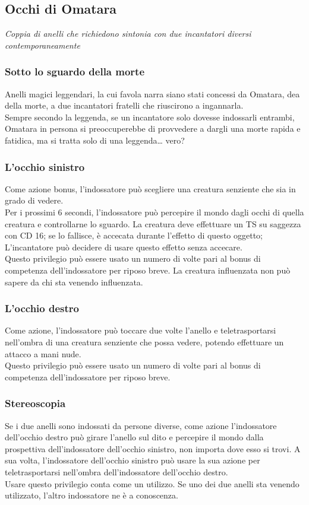 \subsection{Occhi di Omatara}
\textit{Coppia di anelli che richiedono sintonia con due incantatori diversi contemporaneamente}

\subsubsection{Sotto lo sguardo della morte}
Anelli magici leggendari, la cui favola narra siano stati concessi da Omatara, dea della morte, a due incantatori fratelli che riuscirono a ingannarla. \\ Sempre secondo la leggenda, se un incantatore solo dovesse indossarli entrambi, Omatara in persona si preoccuperebbe di provvedere a dargli una morte rapida e fatidica, ma si tratta solo di una leggenda… vero? 

\subsubsection{L'occhio sinistro}
Come azione bonus, l'indossatore può scegliere una creatura senziente che sia in grado di vedere. \\ Per i prossimi 6 secondi, l'indossatore può percepire il mondo dagli occhi di quella creatura e controllarne lo sguardo. La creatura deve effettuare un TS su saggezza con CD 16; se lo fallisce, è accecata durante l'effetto di questo oggetto; L'incantatore può decidere di usare questo effetto senza accecare. \\ Questo privilegio può essere usato un numero di volte pari al bonus di competenza dell'indossatore per riposo breve. La creatura influenzata non può sapere da chi sta venendo influenzata.

\subsubsection{L'occhio destro}
Come azione, l'indossatore può toccare due volte l'anello e teletrasportarsi nell'ombra di una creatura senziente che possa vedere, potendo effettuare un attacco a mani nude. \\ Questo privilegio può essere usato un numero di volte pari al bonus di competenza dell'indossatore per riposo breve.

\subsubsection{Stereoscopia}
Se i due anelli sono indossati da persone diverse, come azione l'indossatore dell'occhio destro può girare l'anello sul dito e percepire il mondo dalla prospettiva dell'indossatore dell'occhio sinistro, non importa dove esso si trovi. A sua volta, l'indossatore dell'occhio sinistro può usare la sua azione per teletrasportarsi nell'ombra dell'indossatore dell'occhio destro. \\ Usare questo privilegio conta come un utilizzo. Se uno dei due anelli sta venendo utilizzato, l'altro indossatore ne è a conoscenza.

